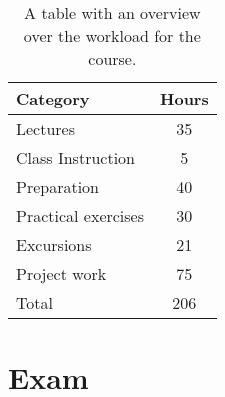\begin{table}[h]
    \centering
    \caption{A table with an overview over the workload for the course.}
    \label{tab:workload}
    \begin{tabular}{ l | c}
        \textbf{Category} & \textbf{Hours} \\ 
        \hline
        Lectures & 35 \\ 

        Class Instruction & 5 \\

        Preparation & 40 \\ 

        Practical exercises & 30 \\

        Excursions & 21 \\

        Project work & 75 \\

        \hline
        Total & 206 \\ 
    \end{tabular}
\end{table}

\section*{Exam}


